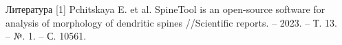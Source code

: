 \documentclass[final]{beamer}
\newlength{\sepwidth}
\newlength{\colwidth}
\newcommand{\separatorcolumn}{\begin{column}{\sepwidth}\end{column}}
\begin{document}
\begin{frame}[t]
\begin{columns}[t]
\begin{column}{\colwidth}
  \begin{block}{Литература}
      [1] Pchitskaya E. et al. SpineTool is an open-source software for analysis of morphology of dendritic spines //Scientific reports. – 2023. – Т. 13. – №. 1. – С. 10561. \\


  \end{block}

\end{column}
\separatorcolumn



\end{columns}
\end{frame}
\end{document}
